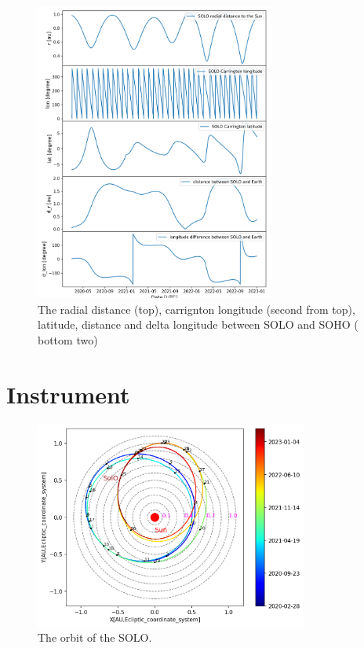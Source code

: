 \begin{figure}
    \centering
    \includegraphics[width = 0.7\textwidth]{images/ACR/SOLO_orbit_helioscentric_2.png}
    \caption{The radial distance (top), carrignton longitude (second from top), latitude, distance and delta longitude between SOLO and SOHO ( bottom two)}
    \label{fig:SOLO_orbit_2}
\end{figure}


\section{Instrument}

\begin{figure}
    \centering
    \includegraphics[width=0.8\textwidth]{images/ACR/SOLO_orbit_helioscentric_carrington_orbitnumber.png}
    \caption{The orbit of the SOLO.}
    \label{fig:SOLO_orbit}
\end{figure}

